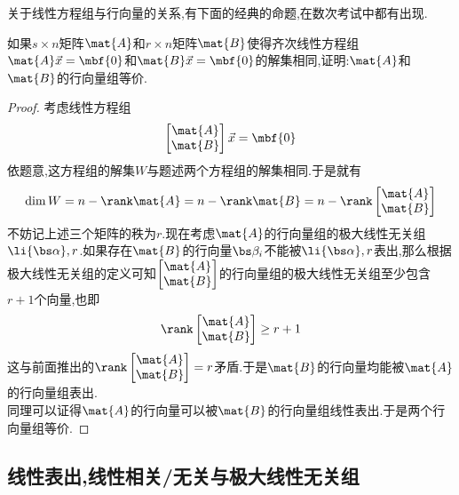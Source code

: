 \documentclass{ctexart}
\begin{document}
\indent 关于线性方程组与行向量的关系,有下面的经典的命题,在数次考试中都有出现.
\begin{problem}
    如果$s\times n$矩阵$\mat{A}$和$r\times n$矩阵$\mat{B}$使得齐次线性方程组$\mat{A}\vec{x}=\mbf{0}$和$\mat{B}\vec{x}=\mbf{0}$的解集相同,证明:$\mat{A}$和$\mat{B}$的行向量组等价.
\end{problem}
\begin{proof}
    考虑线性方程组
    \[\begin{bmatrix}
        \mat{A}\\\mat{B}
    \end{bmatrix}\vec{x}=\mbf{0}\]
    依题意,这方程组的解集$W$与题述两个方程组的解集相同.于是就有
    \[\dim W=n-\rank\mat{A}=n-\rank\mat{B}=n-\rank\begin{bmatrix}
        \mat{A}\\\mat{B}
    \end{bmatrix}\]
    不妨记上述三个矩阵的秩为$r$.现在考虑$\mat{A}$的行向量组的极大线性无关组$\li{\bs\alpha},r$.如果存在$\mat{B}$的行向量$\bs\beta_i$不能被$\li{\bs\alpha},r$表出,那么根据极大线性无关组的定义可知$\begin{bmatrix}
        \mat{A}\\\mat{B}
    \end{bmatrix}$的行向量组的极大线性无关组至少包含$r+1$个向量,也即
    \[\rank\begin{bmatrix}
        \mat{A}\\\mat{B}
    \end{bmatrix}\geq r+1\]
    这与前面推出的$\rank\begin{bmatrix}
        \mat{A}\\\mat{B}
    \end{bmatrix}=r$矛盾.于是$\mat{B}$的行向量均能被$\mat{A}$的行向量组表出.\\
    同理可以证得$\mat{A}$的行向量可以被$\mat{B}$的行向量组线性表出.于是两个行向量组等价.
\end{proof}
\subsection{线性表出,线性相关/无关与极大线性无关组}
\end{document}
